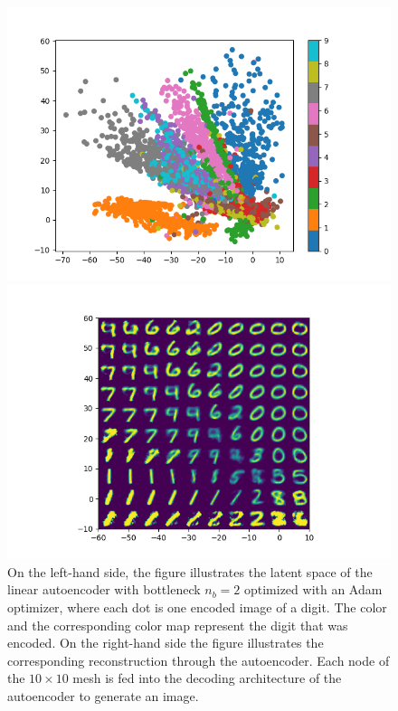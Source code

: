 \begin{figure}
\begin{center}
   \begin{minipage}[b]{0.49\linewidth}
      \includegraphics[trim = 15mm 5mm 15mm 10mm, clip, width=\linewidth]{linear_AE_2d_adam_latent}
	\end{minipage}
   \begin{minipage}[b]{0.49\linewidth}
      \includegraphics[trim = 15mm 5mm 15mm 10mm, clip, width=\linewidth]{linear_AE_2d_adam_reconstruction}
	\end{minipage}
\end{center}
\caption{On the left-hand side, the figure illustrates the latent space of the linear autoencoder with bottleneck $n_b=2$ optimized with an Adam optimizer, where each dot is one encoded image of a digit. The color and the corresponding color map represent the digit that was encoded. On the right-hand side the figure illustrates the corresponding reconstruction through the autoencoder. Each node of the $10\times 10$ mesh is fed into the decoding architecture of the autoencoder to generate an image.}\label{fig:linear_AE_2d_adam_latent}
\end{figure}


